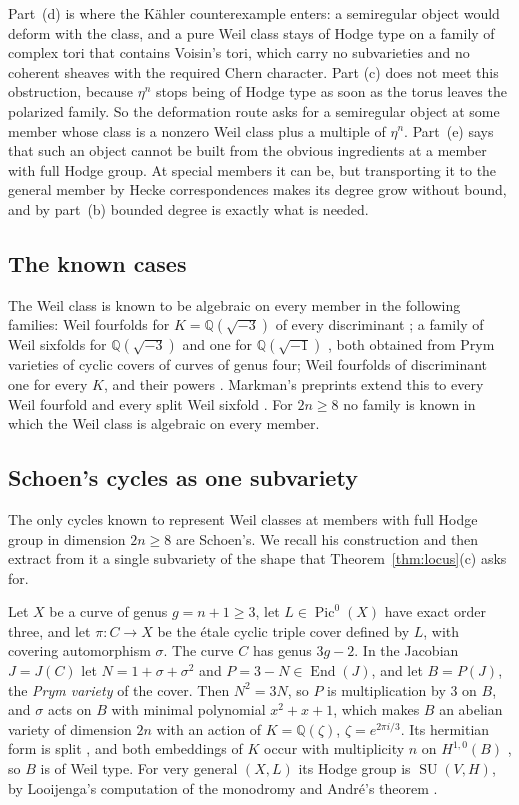 \documentclass[11pt]{amsart}
\theoremstyle{definition}
\theoremstyle{remark}
\newcommand{\QQ}{\mathbb{Q}}
\newcommand{\End}{\operatorname{End}}
\newcommand{\SU}{\operatorname{SU}}
\newcommand{\Pic}{\operatorname{Pic}}
\begin{document}
Part~(d) is where the K\"ahler counterexample enters: a semiregular object
would deform with the class, and a pure Weil class stays of Hodge type on a
family of complex tori that contains Voisin's tori, which carry no
subvarieties and no coherent sheaves with the required Chern character. Part
(c) does not meet this obstruction, because $\eta^{n}$ stops being of Hodge
type as soon as the torus leaves the polarized family. So the deformation
route asks for a semiregular object at some member whose class is a nonzero
Weil class plus a multiple of $\eta^{n}$. Part~(e) says that such an object
cannot be built from the obvious ingredients at a member with full Hodge
group. At special members it can be, but transporting it to the general
member by Hecke correspondences makes its degree grow without bound, and by
part~(b) bounded degree is exactly what is needed.

\subsection{The known cases}

The Weil class is known to be algebraic on every member in the following
families: Weil fourfolds for $K=\QQ(\sqrt{-3})$ of every discriminant
\cite{Sch88,Sch98}; a family of Weil sixfolds for $\QQ(\sqrt{-3})$
\cite{Sch98} and one for $\QQ(\sqrt{-1})$ \cite{Koi04}, both obtained from
Prym varieties of cyclic covers of curves of genus four; Weil fourfolds of
discriminant one for every $K$, and their powers \cite{Fl25}. Markman's
preprints extend this to every Weil fourfold and every split Weil sixfold
\cite{Mar25a}. For $2n\ge8$ no family is known in which the Weil class is
algebraic on every member.

\subsection{Schoen's cycles as one subvariety}

The only cycles known to represent Weil classes at members with full Hodge
group in dimension $2n\ge8$ are Schoen's. We recall his construction and
then extract from it a single subvariety of the shape that
Theorem~\ref{thm:locus}(c) asks for.

Let $X$ be a curve of genus $g=n+1\ge3$, let $L\in\Pic^{0}(X)$ have exact
order three, and let $\pi\colon C\to X$ be the \'etale cyclic triple cover
defined by $L$, with covering automorphism $\sigma$. The curve $C$ has genus
$3g-2$. In the Jacobian $J=J(C)$ let $N=1+\sigma+\sigma^{2}$ and
$P=3-N\in\End(J)$, and let $B=P(J)$, the \emph{Prym variety} of the cover.
Then $N^{2}=3N$, so $P$ is multiplication by $3$ on $B$, and $\sigma$ acts on
$B$ with minimal polynomial $x^{2}+x+1$, which makes $B$ an abelian variety
of dimension $2n$ with an action of $K=\QQ(\zeta)$, $\zeta=e^{2\pi i/3}$. Its
hermitian form is split \cite{Loo97}, and both embeddings of $K$ occur with
multiplicity $n$ on $H^{1,0}(B)$ \cite[Lemma~1.6a]{Sch88}, so $B$ is of Weil
type. For very general $(X,L)$ its Hodge group is $\SU(V,H)$, by Looijenga's
computation of the monodromy \cite{Loo97} and Andr\'e's theorem
\cite{And92}.
\end{document}
